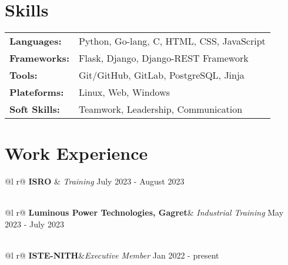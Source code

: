 \documentclass[a4paper,12pt]{article}
\begin{document}
\section{Skills}
\begin{tabularx}{\linewidth}{@{}l X@{}}
\textbf{Languages:} &  \normalsize{Python, Go-lang, C, HTML, CSS, JavaScript}\\
\textbf{Frameworks:}  &  \normalsize{Flask, Django, Django-REST Framework}\\  
\textbf{Tools:} &  \normalsize{Git/GitHub, GitLab, PostgreSQL, Jinja} \\
\textbf{Plateforms:} &  \normalsize{Linux, Web, Windows}\\
\textbf{Soft Skills:} &  \normalsize{Teamwork, Leadership, Communication}\\
\end{tabularx}

\section{Work Experience}

\begin{tabularx}{\linewidth}{ @{}l r@{} }
\textbf {ISRO} & \emph{Training} \hfill July 2023 - August 2023 \\[3.75pt]
  \\
\end{tabularx}

\begin{tabularx}{\linewidth}{ @{}l r@{} }
\textbf{Luminous Power Technologies, Gagret}& \emph{Industrial Training} \hfill May 2023 - July 2023 \\[3.75pt]
  \\
\end{tabularx}

\begin{tabularx}{\linewidth}{ @{}l r@{} }
\textbf{ISTE-NITH}&\emph{Executive Member} \hfill Jan 2022 - present \\[3.75pt]
\end{tabularx}
\end{document}

